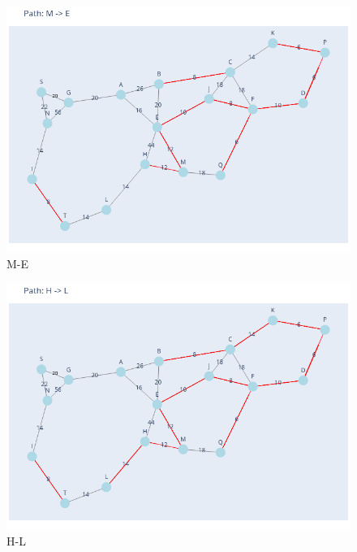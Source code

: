 \documentclass[11pt]{book}
\renewcommand{\=}[1]{\stackrel{#1}{=}} %
\theoremstyle{definition}
\theoremstyle{remark}
\begin{document}
\begin{figure}
    \centering
    \includegraphics[width=1\linewidth]{Trenches/10.png}
    \caption{M-E}
    \label{fig:enter-label}
\end{figure}
\begin{figure}
    \centering
    \includegraphics[width=1\linewidth]{Trenches/12.png}
    \caption{H-L}
    \label{fig:enter-label}
\end{figure}
\end{document}
